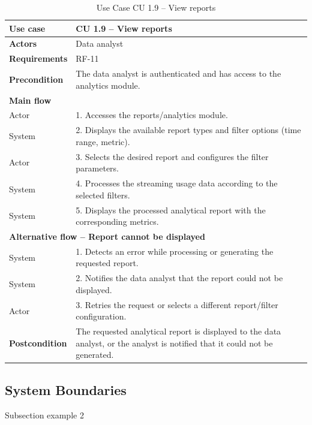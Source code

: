 \documentclass{article}
\begin{document}
\begin{table}[H]
\centering
\small
\renewcommand{\arraystretch}{1.35}
\caption{Use Case CU 1.9 -- View reports}
\label{tab:cu1.9}
\begin{tabularx}{\textwidth}{|l|X|}
\hline
\textbf{Use case} & CU 1.9 -- View reports \\ \hline
\textbf{Actors} & Data analyst \\ \hline
\textbf{Requirements} & RF-11 \\ \hline
\textbf{Precondition} & The data analyst is authenticated and has access to the analytics module. \\ \hline
\multicolumn{2}{|l|}{\textbf{Main flow}} \\ \hline
Actor & 1. Accesses the reports/analytics module. \\ \hline
System & 2. Displays the available report types and filter options (time range, metric). \\ \hline
Actor & 3. Selects the desired report and configures the filter parameters. \\ \hline
System & 4. Processes the streaming usage data according to the selected filters. \\ \hline
System & 5. Displays the processed analytical report with the corresponding metrics. \\ \hline
\multicolumn{2}{|l|}{\textbf{Alternative flow -- Report cannot be displayed}} \\ \hline
System & 1. Detects an error while processing or generating the requested report. \\ \hline
System & 2. Notifies the data analyst that the report could not be displayed. \\ \hline
Actor & 3. Retries the request or selects a different report/filter configuration. \\ \hline
\textbf{Postcondition} & The requested analytical report is displayed to the data analyst, or the analyst is notified that it could not be generated. \\ \hline
\end{tabularx}
\end{table}

\subsection{System Boundaries}
Subsection example 2
\end{document}
